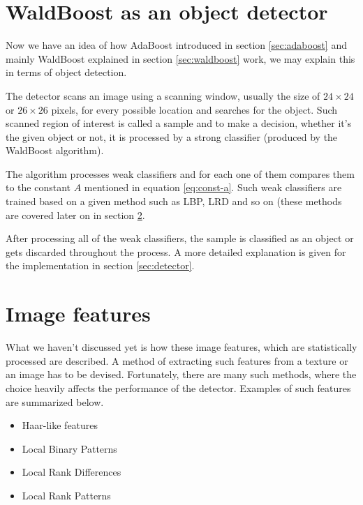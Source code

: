 \section{WaldBoost as an object detector}

Now we have an idea of how AdaBoost introduced in section \ref{sec:adaboost} and mainly WaldBoost explained in section \ref{sec:waldboost} work, we may explain this in terms of object detection.

The detector scans an image using a scanning window, usually the size of $24 \times 24$ or $26 \times 26$ pixels, for every possible location and searches for the object. Such scanned region of interest is called a sample and to make a decision, whether it's the given object or not, it is processed by a strong classifier (produced by the WaldBoost algorithm).

The algorithm processes weak classifiers and for each one of them compares them to the constant $A$ mentioned in equation \ref{eq:const-a}. Such weak classifiers are trained based on a given method such as LBP, LRD and so on (these methods are covered later on in section \ref{sec:app-image-features}.

After processing all of the weak classifiers, the sample is classified as an object or gets discarded throughout the process. A more detailed explanation is given for the implementation in section \ref{sec:detector}.

\section{Image features}\label{sec:app-image-features}

What we haven't discussed yet is how these image features, which are statistically processed are described. A method of extracting such features from a texture or an image has to be devised. Fortunately, there are many such methods, where the choice heavily affects the performance of the detector. Examples of such features are summarized below.

\begin{itemize}
	\item Haar-like features \cite{Viola01rapidobject}
	\item Local Binary Patterns \cite{Ojala02multiresolutiongrayscale}
	\item Local Rank Differences \cite{herout2008impl}
	\item Local Rank Patterns \cite{Hradis08localrank}
\end{itemize}

